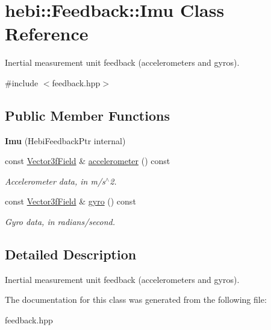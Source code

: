 \hypertarget{classhebi_1_1Feedback_1_1Imu}{}\section{hebi\+:\+:Feedback\+:\+:Imu Class Reference}
\label{classhebi_1_1Feedback_1_1Imu}


Inertial measurement unit feedback (accelerometers and gyros).  




{\ttfamily \#include $<$feedback.\+hpp$>$}

\subsection*{Public Member Functions}
\begin{DoxyCompactItemize}
\item 
{\bfseries Imu} (Hebi\+Feedback\+Ptr internal)\hypertarget{classhebi_1_1Feedback_1_1Imu_ac74ce28691c1e85409d0a41a9d0fd959}{}\label{classhebi_1_1Feedback_1_1Imu_ac74ce28691c1e85409d0a41a9d0fd959}

\item 
const \hyperlink{classhebi_1_1Feedback_1_1Vector3fField}{Vector3f\+Field} \& \hyperlink{classhebi_1_1Feedback_1_1Imu_a55ec4c960a7c7a3b03004170fa8b78c3}{accelerometer} () const \hypertarget{classhebi_1_1Feedback_1_1Imu_a55ec4c960a7c7a3b03004170fa8b78c3}{}\label{classhebi_1_1Feedback_1_1Imu_a55ec4c960a7c7a3b03004170fa8b78c3}

\begin{DoxyCompactList}\small\item\em Accelerometer data, in m/s$^\wedge$2. \end{DoxyCompactList}\item 
const \hyperlink{classhebi_1_1Feedback_1_1Vector3fField}{Vector3f\+Field} \& \hyperlink{classhebi_1_1Feedback_1_1Imu_ae3164a7baa8fd3ecdd3792023f5f4182}{gyro} () const \hypertarget{classhebi_1_1Feedback_1_1Imu_ae3164a7baa8fd3ecdd3792023f5f4182}{}\label{classhebi_1_1Feedback_1_1Imu_ae3164a7baa8fd3ecdd3792023f5f4182}

\begin{DoxyCompactList}\small\item\em Gyro data, in radians/second. \end{DoxyCompactList}\end{DoxyCompactItemize}


\subsection{Detailed Description}
Inertial measurement unit feedback (accelerometers and gyros). 

The documentation for this class was generated from the following file\+:\begin{DoxyCompactItemize}
\item 
feedback.\+hpp\end{DoxyCompactItemize}
